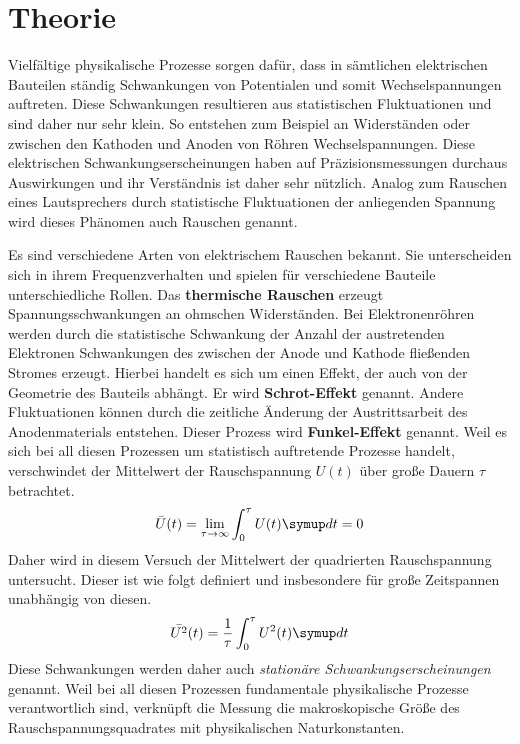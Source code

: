 \section{Theorie}
\label{sec:theorie}

Vielfältige physikalische Prozesse sorgen dafür, dass in sämtlichen elektrischen Bauteilen ständig Schwankungen von Potentialen und somit Wechselspannungen auftreten. Diese Schwankungen resultieren aus statistischen Fluktuationen und sind daher nur sehr klein. So entstehen zum Beispiel an Widerständen oder zwischen den Kathoden und Anoden von Röhren Wechselspannungen. Diese elektrischen Schwankungserscheinungen haben auf Präzisionsmessungen durchaus Auswirkungen und ihr Verständnis ist daher sehr nützlich. Analog zum Rauschen eines Lautsprechers durch statistische Fluktuationen der anliegenden Spannung wird dieses Phänomen auch Rauschen genannt.

Es sind verschiedene Arten von elektrischem Rauschen bekannt. Sie unterscheiden sich in ihrem Frequenzverhalten und spielen für verschiedene Bauteile unterschiedliche Rollen. Das \textbf{thermische Rauschen} erzeugt Spannungsschwankungen an ohmschen Widerständen. Bei Elektronenröhren werden durch die statistische Schwankung der Anzahl der austretenden Elektronen Schwankungen des zwischen der Anode und Kathode fließenden Stromes erzeugt. Hierbei handelt es sich um einen Effekt, der auch von der Geometrie des Bauteils abhängt. Er wird \textbf{Schrot-Effekt} genannt. Andere Fluktuationen können durch die zeitliche Änderung der Austrittsarbeit des Anodenmaterials entstehen. Dieser Prozess wird \textbf{Funkel-Effekt} genannt. Weil es sich bei all diesen Prozessen um statistisch auftretende Prozesse handelt, verschwindet der Mittelwert der Rauschspannung $U(t)$ über große Dauern $\tau$ betrachtet.
%
\begin{equation}
  \bar{U}(t)=\lim_{\tau\rightarrow\infty}\int_0^\tau U(t)\upd t=0
\end{equation}
%
Daher wird in diesem Versuch der Mittelwert der quadrierten Rauschspannung untersucht. Dieser ist wie folgt definiert und insbesondere für große Zeitspannen unabhängig von diesen.
%
\begin{equation}
  \bar{U^2}(t) =\frac{1}{\tau}\int_0^\tau U^2(t) \upd t
\end{equation}
%
Diese Schwankungen werden daher auch \textit{stationäre Schwankungserscheinungen} genannt. Weil bei all diesen Prozessen fundamentale physikalische Prozesse verantwortlich sind, verknüpft die Messung die makroskopische Größe des Rauschspannungsquadrates mit physikalischen Naturkonstanten.


